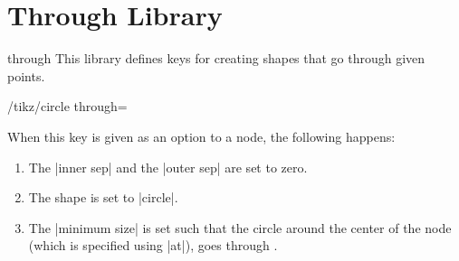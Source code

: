 %
%
%


\section{Through Library}

\label{section-through-library}


\begin{tikzlibrary}{through}
  This library defines keys for creating shapes that go through given
  points. 
\end{tikzlibrary}


\begin{key}{/tikz/circle through=}

  When this key is given as an option to a node, the following
  happens:
  \begin{enumerate}
  \item The |inner sep| and the |outer sep| are set to zero.
  \item The shape is set to |circle|.
  \item The |minimum size| is set such that the circle around the
    center of the node (which is specified using |at|), goes through
    . 
  \end{enumerate}
\begin{codeexample}[]
\end{codeexample}
\end{key}

  

